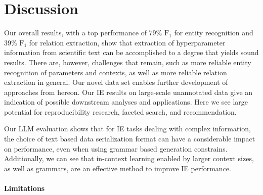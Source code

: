 





\section{Discussion}\label{sec:discussion}

Our overall results, with a top performance of 79\% $\text{F}_1$ for entity recognition and 39\% $\text{F}_1$ for relation extraction, show that extraction of hyperparameter information from scientific text can be accomplished to a degree that yields sound results. There are, however, challenges that remain, such as more reliable entity recognition of parameters and contexts, as well as more reliable relation extraction in general. Our novel data set enables further development of approaches from hereon. Our IE results on large-scale unannotated data give an indication of possible downstream analyses and applications. Here we see large potential for reproducibility research, faceted search, and recommendation.

Our LLM evaluation shows that for IE tasks dealing with complex information, the choice of text based data serialization format can have a considerable impact on performance, even when using grammar based generation constrains. Additionally, we can see that in-context learning enabled by larger context sizes, as well as grammars, are an effective method to improve IE performance.

\paragraph{Limitations}

